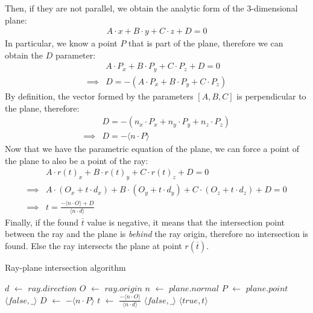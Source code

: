 \documentclass{PoliMi_MasterThesis}
\newcommand*\Let[2]{\State #1 $\gets$ #2}
\begin{document}
Then, if they are not parallel, we obtain the analytic form of the 3-dimensional plane: 
\begin{align*}
	A\cdot x + B\cdot y + C\cdot z + D = 0
\end{align*}
In particular, we know a point $P$ that is part of the plane, therefore we can obtain the $D$ parameter:
\begin{align*}
&A\cdot P_x + B\cdot P_y + C\cdot P_z + D = 0\\
\implies& D = -(A\cdot P_x + B\cdot P_y + C\cdot P_z)
\end{align*}
By definition, the vector formed by the parameters $[A,B,C]$ is perpendicular to the plane, therefore:
\begin{align*}
&D = -(n_x\cdot P_x + n_y\cdot P_y + n_z\cdot P_z)\\
\implies& D = -\langle n \cdot P \rangle
\end{align*}
Now that we have the parametric equation of the plane, we can force a point of the plane to also be a point of the ray: 
\begin{align*}
	&A\cdot r(t)_x + B\cdot r(t)_y + C\cdot r(t)_z + D = 0\\
	\implies& A\cdot (O_x + t\cdot d_x) + B\cdot (O_y + t\cdot d_y) + C\cdot (O_z + t\cdot d_z) + D = 0\\
	\implies& t = \frac{-\langle n\cdot O \rangle + D}{\langle n\cdot d \rangle}
\end{align*}
Finally, if the found $\overline{t}$ value is negative, it means that the intersection point between the ray and the plane is \textit{behind} the ray origin, therefore no intersection is found. Else the ray intersects the plane at point $r(\overline{t})$.

\begin{algorithm}[H]
	\caption{Ray-plane intersection algorithm}
	\begin{algorithmic}[1]
		\Let{$d$}{$ray.direction$}
		\Let{$O$}{$ray.origin$}
		\Let{$n$}{$plane.normal$}
		\Let{$P$}{$plane.point$}
		 
			\State \Return $\langle false, \_ \rangle$
		\EndIf
		\Let{$D$}{$-\langle n\cdot P \rangle$}
		\Let{$t$}{$\frac{-\langle n\cdot O \rangle}{\langle n\cdot d \rangle}$}
		 
			\State \Return $\langle false, \_ \rangle$
		\Else
			\State \Return $\langle true, t \rangle$
		\EndIf
		\EndFunction
	\end{algorithmic}
\end{algorithm} 
\end{document}
